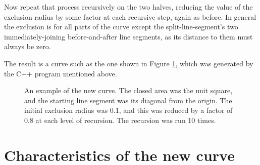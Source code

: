 \documentclass[12pt]{article}
\begin{document}
Now repeat that process recursively on the two halves, reducing the
value of the exclusion radius by some factor at each recursive step,
again as before.  In general the exclusion is for all parts of the
curve except the split-line-segment's two immediately-joining
before-and-after line segments, as its distance to them must always be
zero.

The result is a curve such as the one shown in Figure \ref{new_f1}, which was
generated by the C++ program mentioned above.
\begin{figure}[h!]
 \begin{center} 
  \parbox{110mm}{\caption{\label{new_f1} An example of the new curve.  The closed
  area was the unit square, and the starting line segment was its
  diagonal from the origin.  The initial exclusion radius was 0.1, and
  this was reduced by a factor of 0.8 at each level of recursion.  The
  recursion was run 10 times.}}
\end{center}
\end{figure}

\section*{Characteristics of the new curve}
\end{document}
